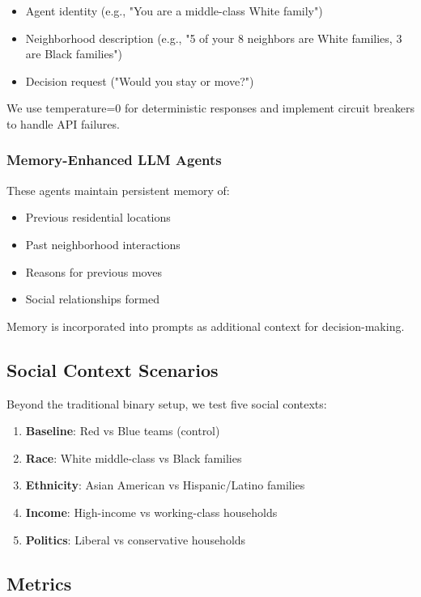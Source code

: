 \documentclass[pdflatex,sn-basic]{sn-jnl}%
\theoremstyle{thmstyleone}%
\theoremstyle{thmstyletwo}%
\theoremstyle{thmstylethree}%
\begin{document}
\begin{itemize}
\item Agent identity (e.g., "You are a middle-class White family")
\item Neighborhood description (e.g., "5 of your 8 neighbors are White families, 3 are Black families")
\item Decision request ("Would you stay or move?")
\end{itemize}

We use temperature=0 for deterministic responses and implement circuit breakers to handle API failures.

\subsubsection{Memory-Enhanced LLM Agents}

These agents maintain persistent memory of:
\begin{itemize}
\item Previous residential locations
\item Past neighborhood interactions
\item Reasons for previous moves
\item Social relationships formed
\end{itemize}

Memory is incorporated into prompts as additional context for decision-making.

\subsection{Social Context Scenarios}

Beyond the traditional binary setup, we test five social contexts:

\begin{enumerate}
\item \textbf{Baseline}: Red vs Blue teams (control)
\item \textbf{Race}: White middle-class vs Black families  
\item \textbf{Ethnicity}: Asian American vs Hispanic/Latino families
\item \textbf{Income}: High-income vs working-class households
\item \textbf{Politics}: Liberal vs conservative households
\end{enumerate}

\subsection{Metrics}
\end{document}
